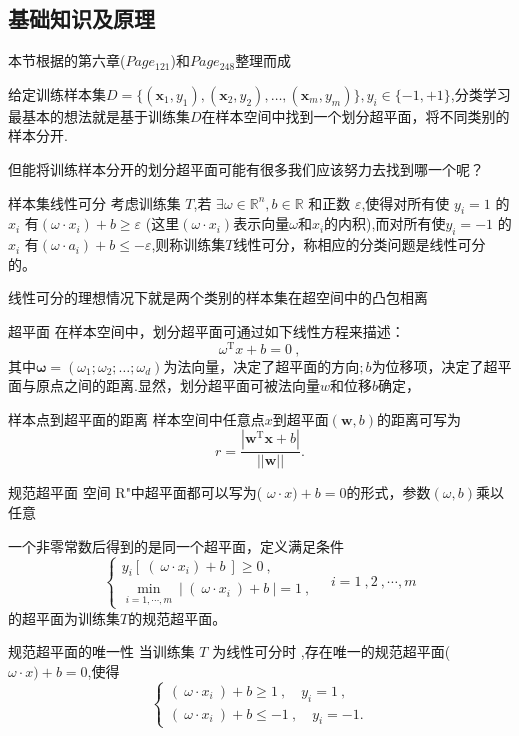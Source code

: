 \documentclass[12pt]{ctexart}
\numberwithin{equation}{section} %
\begin{document}
\subsection{基础知识及原理}
本节根据\cite{周志华}的第六章($Page_{121}$)和\cite{司守奎}$Page_{248}$整理而成

给定训练样本集$D=\{(\boldsymbol{x}_1,y_1),(\boldsymbol{x}_2,y_2),\ldots,(\boldsymbol{x}_m,y_m)\},y_i\in\{-1,+1\}$,分类学习最基本的想法就是基于训练集$D$在样本空间中找到一个划分超平面，将不同类别的样本分开.

但能将训练样本分开的划分超平面可能有很多我们应该努力去找到哪一个呢？
\begin{mydef}{样本集线性可分}
  考虑训练集 $T$,若 $\exists\omega\in\mathbb{R}^n,b\in\mathbb{R}$ 和正数 $\varepsilon$,使得对所有使 $y_i=1$ 的$x_i$ 有$(\omega\cdot x_i)+b\geq\varepsilon$ (这里$(\omega\cdot x_i)$表示向量$\omega$和$x_i$的内积),而对所有使$y_i=-1$ 的$x_i$ 有$(\omega\cdot a_i)+b\leqslant-\varepsilon$,则称训练集$T$线性可分，称相应的分类问题是线性可分的。
\end{mydef}
线性可分的理想情况下就是两个类别的样本集在超空间中的凸包相离
\begin{mydef}{超平面}
  在样本空间中，划分超平面可通过如下线性方程来描述：
$$\omega^\mathrm{T}x+b=0\:,$$
其中$\boldsymbol{\omega}=(\omega_1;\omega_2;\ldots;\omega_d)$为法向量，决定了超平面的方向$;b$为位移项，决定了超平面与原点之间的距离.显然，划分超平面可被法向量$w$和位移$b$确定，
\end{mydef}
\begin{mydef}{样本点到超平面的距离}
  样本空间中任意点$x$到超平面$(\boldsymbol{w},b)$的距离可写为
$$r=\frac{|\boldsymbol{w}^\mathrm{T}\boldsymbol{x}+b|}{||\boldsymbol{w}||}.$$
\end{mydef}
\begin{mydef}{规范超平面}
空间 R"中超平面都可以写为( $\omega\cdot x)+b=0$的形式，参数$(\omega,b)$乘以任意

一个非零常数后得到的是同一个超平面，定义满足条件
$$\begin{cases}y_i[\:(\:\omega\cdot x_i)+b\:]\geqslant0\:,\\\min_{i=1,\cdots,m}\:|\:(\:\omega\cdot x_i\:)+b\:|=1\:,\end{cases}\quad i=1\:,2\:,\cdots,m$$
的超平面为训练集$T$的规范超平面。
\end{mydef}
\begin{mytheo}{规范超平面的唯一性}
  当训练集 $T$ 为线性可分时 ,存在唯一的规范超平面( $\omega\cdot x)+b=0$,使得
$$\begin{cases}(\:\omega\cdot x_i\:)+b\geqslant1\:,\quad y_i=1\:,\\(\:\omega\cdot x_i\:)+b\leqslant-1\:,\quad y_i=-1.\end{cases}$$
\end{mytheo}
\end{document}
